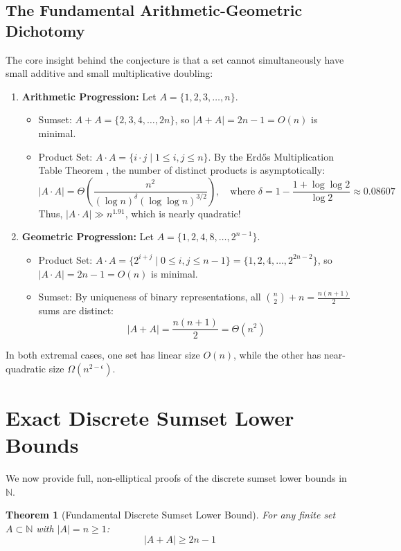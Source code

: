 \documentclass[11pt,a4paper]{article}
\newtheorem{theorem}{Theorem}[section]
\theoremstyle{definition}
\begin{document}
\subsection{The Fundamental Arithmetic-Geometric Dichotomy}
The core insight behind the conjecture is that a set cannot simultaneously have small additive and small multiplicative doubling:
\begin{enumerate}
    \item \textbf{Arithmetic Progression:} Let $A = \{1, 2, 3, \dots, n\}$.
    \begin{itemize}
        \item Sumset: $A + A = \{2, 3, 4, \dots, 2n\}$, so $|A + A| = 2n - 1 = O(n)$ is minimal.
        \item Product Set: $A \cdot A = \{i \cdot j \mid 1 \le i, j \le n\}$. By the Erd\H{o}s Multiplication Table Theorem \cite{erdos1960table}, the number of distinct products is asymptotically:
        \[ |A \cdot A| = \Theta\left(\frac{n^2}{(\log n)^\delta (\log\log n)^{3/2}}\right), \quad \text{where } \delta = 1 - \frac{1 + \log\log 2}{\log 2} \approx 0.08607 \]
        Thus, $|A \cdot A| \gg n^{1.91}$, which is nearly quadratic!
    \end{itemize}
    \item \textbf{Geometric Progression:} Let $A = \{1, 2, 4, 8, \dots, 2^{n-1}\}$.
    \begin{itemize}
        \item Product Set: $A \cdot A = \{2^{i+j} \mid 0 \le i, j \le n-1\} = \{1, 2, 4, \dots, 2^{2n-2}\}$, so $|A \cdot A| = 2n - 1 = O(n)$ is minimal.
        \item Sumset: By uniqueness of binary representations, all $\binom{n}{2} + n = \frac{n(n+1)}{2}$ sums are distinct:
        \[ |A + A| = \frac{n(n+1)}{2} = \Theta(n^2) \]
    \end{itemize}
\end{enumerate}
In both extremal cases, one set has linear size $O(n)$, while the other has near-quadratic size $\Omega(n^{2-\epsilon})$.

\section{Exact Discrete Sumset Lower Bounds}

We now provide full, non-elliptical proofs of the discrete sumset lower bounds in $\mathbb{N}$.

\begin{theorem}[Fundamental Discrete Sumset Lower Bound]\label{thm:sumset_bound}
For any finite set $A \subset \mathbb{N}$ with $|A| = n \ge 1$:
\begin{equation}\label{eq:sumset_bound}
|A + A| \ge 2n - 1
\end{equation}
\end{theorem}
\end{document}
